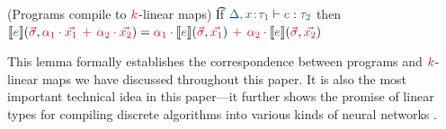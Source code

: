 \begin{blem}{(Programs compile to $\rd{k}$-linear maps)}{}
  \vspace{.25em}
\t{If }$\p{\D,\bind{x}{\ty_1}}{e}{\ty_2}$ \t{ then } $\cm{e}(\svec,\a1\rt\xv1\rp\a2\rt\xv2)=\a1\rt\cm{e}(\svec,\xv1)\rp \a2\rt\cm{e}(\svec,\xv2)$
\end{blem}
\vspace{.4em}

This lemma formally establishes the correspondence between programs and $\rd{k}$-linear maps
we have discussed throughout this paper. It is also the most important technical idea
in this paper---it further shows the promise of linear types for compiling discrete
algorithms into various kinds of neural networks \citep{velez2026compiling,velez2026compiling2}. 
